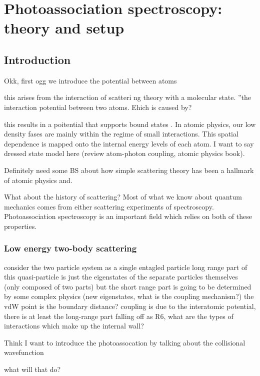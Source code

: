 \chapter{Photoassociation spectroscopy: theory and setup}
\label{ch:chap3}

\section{Introduction}
\label{sec:pas_intro}

Okk, first ogg we introduce the potential between atoms

this arises from the interaction of scatteri ng theory with a molecular state. ''the interaction potential between two atoms. Ehich is caused by?

this results in a poitential that supports bound states . In atomic physics, our low density fases are mainly within the regime of small interactions. This spatial dependence is mapped onto the internal energy levels of each atom. I want to say dressed state model here (review atom-photon coupling, atomic physics book).

Definitely need some BS about how simple scattering theory has been a hallmark of atomic physics and.

What about the history of scattering? Most of what we know about quantum mechanics comes from either scattering experiments of spectroscopy. Photoassociation spectroscopy is an important field which relies on both of these properties.

\subsection{Low energy two-body scattering}
\label{ssec:scattering}

consider the two particle system as a single entagled particle
	long range part of this quasi-particle is just the eigenstates of the separate particles themselves (only composed of two parts)
	but the short range part is going to be determined by some complex physics (new eigenstates, what is the coupling mechanism?)
		the vdW point is the boundary distance?
		coupling is due to the interatomic potential, there is at least the long-range part falling off as R6, what are the types of interactions which make up the internal wall?


Think I want to introduce the photoassocation by talking about the collisional wavefunction

what will that do?

